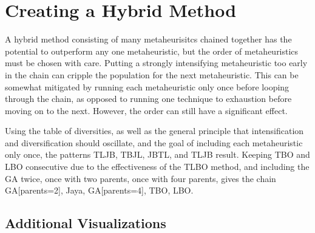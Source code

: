 \documentclass[11pt, letterpaper, onecolumn]{article}
\begin{document}
\section{Creating a Hybrid Method}

A hybrid method consisting of many metaheurisitcs chained together has the potential to outperform any one metaheuristic, but the order of metaheuristics must be chosen with care. Putting a strongly intensifying metaheuristic too early in the chain can cripple the population for the next metaheuristic. This can be somewhat mitigated by running each metaheuristic only once before looping through the chain, as opposed to running one technique to exhaustion before moving on to the next. However, the order can still have a significant effect. 

Using the table of diversities, as well as the general principle that intensification and diversification should oscillate, and the goal of including each metaheuristic only once, the patterns TLJB, TBJL, JBTL, and TLJB result. Keeping TBO and LBO consecutive due to the effectiveness of the TLBO method, and including the GA twice, once with two parents, once with four parents, gives the chain GA[parents=2], Jaya, GA[parents=4], TBO, LBO. 

\subsection{Additional Visualizations}
\end{document}
